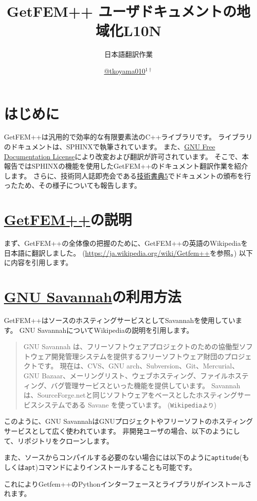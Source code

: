 \documentclass{../../style/ltjoc}
\title{GetFEM++ ユーザドキュメントの地域化L10N}
\subtitle{日本語翻訳作業}
\author{%
\href{https://twitter.com/tkoyama010}{@tkoyama010}$^{1\dagger}$%
}
\affiliation{%
${}^{1}$\href{https://tkoyama010.github.io/getfem-docs-html-ja/}{GetFEM++ 日本語チーム}%
}
\begin{document}
\maketitle
\section{はじめに}
GetFEM++は汎用的で効率的な有限要素法のC++ライブラリです。
ライブラリのドキュメントは、SPHINXで執筆されています。
また、\href{https://www.gnu.org/licenses/fdl.html}{GNU Free Documentation License}により改変および翻訳が許可されています。
そこで、本報告ではSPHINXの機能を使用したGetFEM++のドキュメント翻訳作業を紹介します。
さらに、技術同人誌即売会である\href{https://techbookfest.org/event/tbf05}{技術書典5}でドキュメントの頒布を行ったため、その様子についても報告します。
\section{\href{http://getfem.org}{GetFEM++}の説明}
まず、GetFEM++の全体像の把握のために、GetFEM++の英語のWikipediaを日本語に翻訳しました。
(\href{https://ja.wikipedia.org/wiki/Getfem++}{https://ja.wikipedia.org/wiki/Getfem++}を参照。)
以下に内容を引用します。
\section{\href{https://savannah.gnu.org}{GNU Savannah}の利用方法}
GetFEM++はソースのホスティングサービスとしてSavannahを使用しています。
GNU SavannahについてWikipediaの説明を引用します。
\begin{quote}
GNU Savannah は、フリーソフトウェアプロジェクトのための協働型ソフトウェア開発管理システムを提供するフリーソフトウェア財団のプロジェクトです。
現在は、CVS、GNU arch、Subversion、Git、Mercurial、GNU Bazaar、メーリングリスト、ウェブホスティング、ファイルホスティング、バグ管理サービスといった機能を提供しています。
Savannah は、SourceForge.netと同じソフトウェアをベースとしたホスティングサービスシステムである Savane を使っています。
(\texttt{Wikipediaより})
\end{quote}
このように、GNU SavannahはGNUプロジェクトやフリーソフトのホスティングサービスとして広く使われています。
非開発ユーザの場合、以下のようにして、リポジトリをクローンします。
\begin{shbox}
\end{shbox}
また、ソースからコンパイルする必要のない場合には以下のように\texttt{aptitude}(もしくは\texttt{apt})コマンドによりインストールすることも可能です。
\begin{shbox}
\end{shbox}
これによりGetfem++のPythonインターフェースとライブラリがインストールされます。
\end{document}

